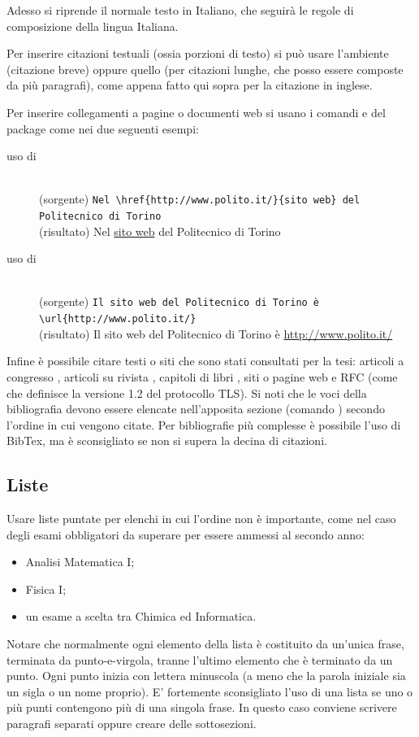 Adesso si riprende il normale testo in Italiano, che seguirà le regole di composizione della lingua Italiana.

Per inserire citazioni testuali (ossia porzioni di testo) si può usare l'ambiente  (citazione breve) oppure quello  (per citazioni lunghe, che posso essere composte da più paragrafi), come appena fatto qui sopra per la citazione in inglese.

Per inserire collegamenti a pagine o documenti web si usano i comandi  e  del package  come nei due seguenti esempi:
\begin{description}
\item[uso di ]\mbox{}\\
(sorgente) \verb+Nel \href{http://www.polito.it/}{sito web} del Politecnico di Torino+
\\
(risultato) Nel \href{http://www.polito.it/}{sito web} del Politecnico di Torino
\item[uso di ]\mbox{}\\
(sorgente) \verb+Il sito web del Politecnico di Torino è \url{http://www.polito.it/}+
\\
(risultato) Il sito web del Politecnico di Torino è \url{http://www.polito.it/}
\end{description}

Infine è possibile citare testi o siti che sono stati consultati per la tesi: articoli a congresso \cite{psisec},
articoli su rivista \cite{tpa}, capitoli di libri \cite{tc}, siti o pagine web \cite{openssl} e RFC (come  \cite{tls12} che definisce la versione 1.2 del protocollo TLS).
Si noti che le voci della bibliografia devono essere elencate nell'apposita sezione (comando ) secondo l'ordine in cui vengono citate.
Per bibliografie più complesse è possibile l'uso di BibTex, ma è sconsigliato se non si supera la decina di citazioni.


\subsection{Liste}

Usare liste puntate per elenchi in cui l'ordine non è importante, come nel caso degli esami obbligatori da superare per essere ammessi al secondo anno:
\begin{itemize}
\item
Analisi Matematica I;
\item
Fisica I;
\item
un esame a scelta tra Chimica ed Informatica.
\end{itemize}
Notare che normalmente ogni elemento della lista è costituito da un'unica frase, terminata da punto-e-virgola, tranne l'ultimo elemento che è terminato da un punto. Ogni punto inizia con lettera minuscola (a meno che la parola iniziale sia un sigla o un nome proprio). E' fortemente sconsigliato l'uso di una lista se uno o più punti contengono più di una singola frase. In questo caso conviene scrivere paragrafi separati oppure creare delle sottosezioni.

